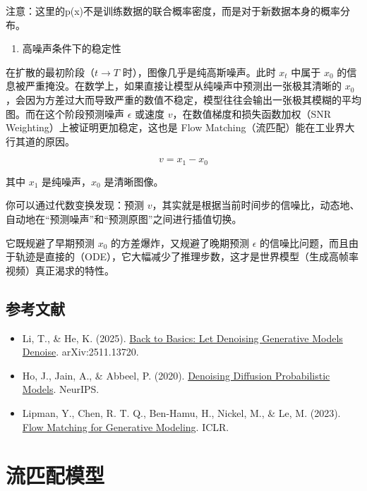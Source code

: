 注意：这里的p(x)不是训练数据的联合概率密度，而是对于新数据本身的概率分布。

\begin{enumerate}
\def\labelenumi{\arabic{enumi}.}
\setcounter{enumi}{2}
\tightlist
\item
  高噪声条件下的稳定性
\end{enumerate}

在扩散的最初阶段（\(t\to T\) 时），图像几乎是纯高斯噪声。此时 \(x_t\) 中属于 \(x_0\) 的信息被严重掩没。在数学上，如果直接让模型从纯噪声中预测出一张极其清晰的 \(x_0\)，会因为方差过大而导致严重的数值不稳定，模型往往会输出一张极其模糊的平均图。而在这个阶段预测噪声 \(\epsilon\) 或速度 \(v\)，在数值梯度和损失函数加权（SNR Weighting）上被证明更加稳定，这也是 Flow Matching（流匹配）能在工业界大行其道的原因。

\[
v=x_1-x_0
\]

其中 \(x_1\) 是纯噪声，\(x_0\) 是清晰图像。

你可以通过代数变换发现：预测 \(v\)，其实就是根据当前时间步的信噪比，动态地、自动地在``预测噪声''和``预测原图''之间进行插值切换。

它既规避了早期预测 \(x_0\) 的方差爆炸，又规避了晚期预测 \(\epsilon\) 的信噪比问题，而且由于轨迹是直接的（ODE），它大幅减少了推理步数，这才是世界模型（生成高帧率视频）真正渴求的特性。

\hypertarget{ux53c2ux8003ux6587ux732e-159}{%
\subsection{参考文献}\label{ux53c2ux8003ux6587ux732e-159}}

\begin{itemize}
\tightlist
\item
  Li, T., \& He, K. (2025). \href{https://arxiv.org/abs/2511.13720}{Back to Basics: Let Denoising Generative Models Denoise}. arXiv:2511.13720.
\item
  Ho, J., Jain, A., \& Abbeel, P. (2020). \href{https://arxiv.org/abs/2006.11239}{Denoising Diffusion Probabilistic Models}. NeurIPS.
\item
  Lipman, Y., Chen, R. T. Q., Ben-Hamu, H., Nickel, M., \& Le, M. (2023). \href{https://arxiv.org/abs/2210.02747}{Flow Matching for Generative Modeling}. ICLR.
\end{itemize}

\clearpage

\hypertarget{ux6d41ux5339ux914dux6a21ux578b}{%
\section{流匹配模型}\label{ux6d41ux5339ux914dux6a21ux578b}}

